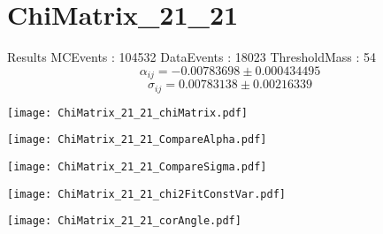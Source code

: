 \documentclass[a4paper,12pt]{article}
\begin{document}
\section{ChiMatrix\_21\_21}
\begin{minipage}{0.49\linewidth} Results \newline
MCEvents : 104532\newline
DataEvents : 18023 \newline
ThresholdMass : 54\\
$$\alpha_{ij} = -0.00783698\pm 0.000434495$$
$$\sigma_{ij} = 0.00783138\pm 0.00216339$$
\end{minipage}\hfill
\begin{minipage}{0.49\linewidth} 
\texttt{[image: ChiMatrix\_21\_21\_chiMatrix.pdf]}\\
\end{minipage}
\hfill
\begin{minipage}{0.49\linewidth} 
\texttt{[image: ChiMatrix\_21\_21\_CompareAlpha.pdf]}\\
\end{minipage}
\hfill
\begin{minipage}{0.49\linewidth} 
\texttt{[image: ChiMatrix\_21\_21\_CompareSigma.pdf]}\\
\end{minipage}
\begin{minipage}{0.49\linewidth} 
\texttt{[image: ChiMatrix\_21\_21\_chi2FitConstVar.pdf]}\\
\end{minipage}
\hfill
\begin{minipage}{0.49\linewidth} 
\texttt{[image: ChiMatrix\_21\_21\_corAngle.pdf]}\\
\end{minipage}
\end{document}
